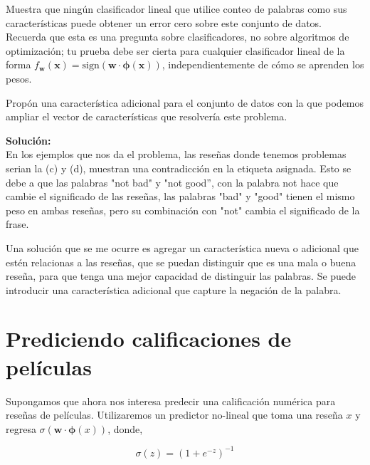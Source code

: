 \documentclass[11pt,letterpaper]{article}
\newenvironment{solution}{%
  \noindent\begin{shaded}
  \textbf{Solución:}\ }{
  \end{shaded}%
}
\begin{document}
\begin{enumerate}
\begin{itemize}
Muestra que ningún clasificador lineal que utilice conteo de palabras como sus características puede obtener un error cero sobre este conjunto de datos. Recuerda que esta es una pregunta sobre clasificadores, no sobre algoritmos de optimización; tu prueba debe ser cierta para cualquier clasificador lineal de la forma $f_{\mathbf{w}}(\mathbf{x}) = \text{sign}(\mathbf{w} \cdot \boldsymbol{\phi}(\mathbf{x}))$, independientemente de cómo se aprenden los pesos.

Propón una característica adicional para el conjunto de datos con la que podemos ampliar el vector de características que resolvería este problema.

\end{itemize}

\begin{solution}
  \\En los ejemplos que nos da el problema, las reseñas donde tenemos problemas serian la (c) y (d), muestran una contradicción en la etiqueta asignada. Esto se debe a que las palabras "not bad" y "not good”, con la palabra not hace que cambie el significado de las reseñas, las palabras "bad" y "good" tienen el mismo peso en ambas reseñas, pero su combinación con "not" cambia el significado de la frase.

Una solución que se me ocurre es agregar un característica nueva o adicional que estén relacionas a las reseñas, que se puedan distinguir que es una mala o buena reseña, para que tenga una mejor capacidad de distinguir las palabras. Se puede introducir una característica adicional que capture la negación de la palabra.

  \end{solution}

\end{enumerate}


\section*{Prediciendo calificaciones de películas}


Supongamos que ahora nos interesa predecir una calificación numérica para reseñas de películas. Utilizaremos un predictor no-lineal que toma una reseña $x$ y regresa $\sigma(\mathbf{w} \cdot \boldsymbol{\phi}(x))$, donde,

 \[\sigma(z) = (1 + e^{-z} )^{-1}\]
\end{document}
